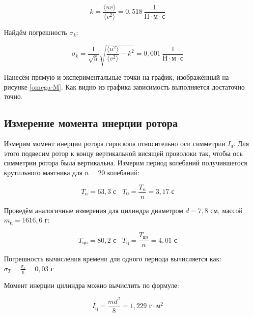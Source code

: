 \documentclass[a4paper,12pt]{article}
\begin{document}

\begin{equation}
    k = \frac{\langle uv\rangle}{\langle v^2 \rangle} = 0,518 \ \frac{1}{\text{Н} \cdot \text{м} \cdot \text{с}}
\end{equation}

Найдём погрешность $\sigma_k$:

\begin{equation}
    \sigma_k = \frac{1}{\sqrt{5}} \sqrt{\frac{\langle u^2 \rangle}{\langle v^2 \rangle} - k^2} = 0,001 \ \frac{1}{\text{Н} \cdot \text{м} \cdot \text{с}}
\end{equation}

Нанесём прямую и экспериментальные точки на график, изображённый на рисунке \ref{omega-M}. Как видно из графика зависимость выполняется достаточно точно.

\subsection{Измерение момента инерции ротора}

Измерим момент инерции ротора гироскопа относительно оси симметрии $I_0$. Для этого подвесим ротор к концу вертикальной висящей проволоки так, чтобы ось симметрии ротора была вертикальна. Измерим период колебаний получившегося крутильного маятника для $n = 20$ колебаний:

\begin{equation}
    T_{n} = 63,3 \text{ с} \ \ \ \ T_0 = \frac{T_{n}}{n} = 3,17 \text{ с}
\end{equation}

Проведём аналогичные измерения для цилиндра диаметром $d = 7,8 \text{ см}$, массой $m_\text{ц} = 1616,6 \text{ г}$:

\begin{equation}
    T_{\text{ц}n} = 80,2 \text{ с} \ \ \ \ T_\text{ц} = \frac{T_{\text{ц}n}}{n} = 4,01 \text{ с}
\end{equation}

Погрешность вычисления времени для одного периода вычисляется как: $\sigma_T = \frac{\sigma_s}{n} = 0,03 \text{ с}$

Момент инерции цилиндра можно вычислить по формуле:

\begin{equation}
    I_\text{ц} = \frac{m d^2}{8} = 1,229 \text{ г} \cdot \text{м}^2
\end{equation}
\end{document}
